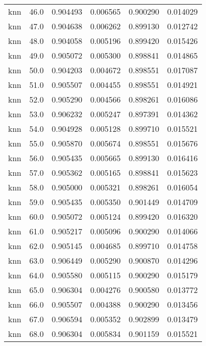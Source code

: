 \begin{tabular}{lrrrrr}
     knn &       46.0 &    0.904493 &   0.006565 &   0.900290 &  0.014029 \\
     knn &       47.0 &    0.904638 &   0.006262 &   0.899130 &  0.012742 \\
     knn &       48.0 &    0.904058 &   0.005196 &   0.899420 &  0.015426 \\
     knn &       49.0 &    0.905072 &   0.005300 &   0.898841 &  0.014865 \\
     knn &       50.0 &    0.904203 &   0.004672 &   0.898551 &  0.017087 \\
     knn &       51.0 &    0.905507 &   0.004455 &   0.898551 &  0.014921 \\
     knn &       52.0 &    0.905290 &   0.004566 &   0.898261 &  0.016086 \\
     knn &       53.0 &    0.906232 &   0.005247 &   0.897391 &  0.014362 \\
     knn &       54.0 &    0.904928 &   0.005128 &   0.899710 &  0.015521 \\
     knn &       55.0 &    0.905870 &   0.005674 &   0.898551 &  0.015676 \\
     knn &       56.0 &    0.905435 &   0.005665 &   0.899130 &  0.016416 \\
     knn &       57.0 &    0.905362 &   0.005165 &   0.898841 &  0.015623 \\
     knn &       58.0 &    0.905000 &   0.005321 &   0.898261 &  0.016054 \\
     knn &       59.0 &    0.905435 &   0.005350 &   0.901449 &  0.014709 \\
     knn &       60.0 &    0.905072 &   0.005124 &   0.899420 &  0.016320 \\
     knn &       61.0 &    0.905217 &   0.005096 &   0.900290 &  0.014066 \\
     knn &       62.0 &    0.905145 &   0.004685 &   0.899710 &  0.014758 \\
     knn &       63.0 &    0.906449 &   0.005290 &   0.900870 &  0.014296 \\
     knn &       64.0 &    0.905580 &   0.005115 &   0.900290 &  0.015179 \\
     knn &       65.0 &    0.906304 &   0.004276 &   0.900580 &  0.013772 \\
     knn &       66.0 &    0.905507 &   0.004388 &   0.900290 &  0.013456 \\
     knn &       67.0 &    0.906594 &   0.005352 &   0.902899 &  0.013479 \\
     knn &       68.0 &    0.906304 &   0.005834 &   0.901159 &  0.015521 \\

\end{tabular}
